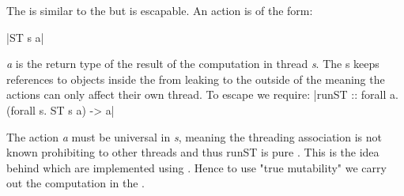 \documentclass[thesis-solanki.tex]{subfiles}
\begin{document}

The  is similar to the  but is escapable. An  action  is of the 
form:

|ST s a|

\textit{a} is the return type of the result of the computation in thread \textit{s}. The s keeps references to objects inside the 
 from leaking to the outside of the  meaning the actions can only affect their own 
thread. To escape we require:
|runST :: forall a. (forall s. ST s a) -> a|

The action \textit{a} must be universal in \textit{s}, meaning the threading association is not known prohibiting to other threads and thus 
runST is pure \cite{website:stmonadwiki, website:stmonadstackoverflow}. This is the idea behind  which are 
implemented using . Hence to use "true mutability" we carry out the computation in the .
\end{document}
